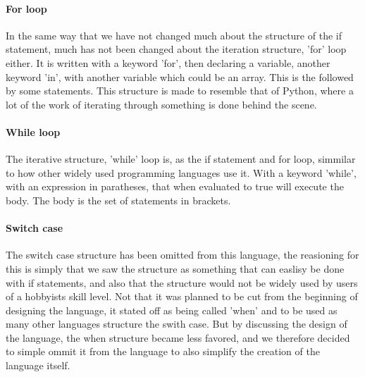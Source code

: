\paragraph*{For loop}
In the same way that we have not changed much about the structure of the if statement, much has not been changed about the iteration structure, 'for' loop either. It is written with a keyword 'for', then declaring a variable, another keyword 'in', with another variable which could be an array. This is the followed by some statements.
This structure is made to resemble that of Python, where a lot of the work of iterating through something is done behind the scene.

\paragraph*{While loop}
The iterative structure, 'while' loop is, as the if statement and for loop, simmilar to how other widely used programming languages use it. With a keyword 'while', with an expression in paratheses, that when evaluated to true will execute the body. The body is the set of statements in brackets. 

\paragraph*{Switch case}
The switch case structure has been omitted from this language, the reasioning for this is simply that we saw the structure as something that can easlisy be done with if statements, and also that the structure would not be widely used by users of a hobbyists skill level. Not that it was planned to be cut from the beginning of designing the language, it stated off as being called 'when' and to be used as many other languages structure the swith case. But by discussing the design of the language, the when structure became less favored, and we therefore decided to simple ommit it from the language to also simplify the creation of the language itself. 
